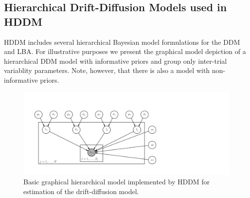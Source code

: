 \documentclass[letterpaper,10pt,english]{sphinxmanual}
\begin{document}
\subsection{Hierarchical Drift-Diffusion Models used in HDDM}
\label{methods:hierarchical-drift-diffusion-models-used-in-hddm}
HDDM includes several hierarchical Bayesian model formulations for the
DDM and LBA. For illustrative purposes we present the graphical model
depiction of a hierarchical DDM model with informative priors and
group only inter-trial variablity parameters. Note, however, that
there is also a model with non-informative priors.
\begin{figure}[htbp]
\centering
\capstart

\includegraphics[scale=.5]{graphical_hddm.pdf}
\caption{Basic graphical hierarchical model implemented by HDDM for
estimation of the drift-diffusion model.}\end{figure}
\end{document}
